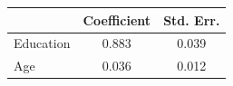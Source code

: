 \begin{tabular}{lcc}
\toprule
 & Coefficient & Std. Err. \\
\midrule
Education &  0.883 &  0.039 \\
Age &  0.036 &  0.012 \\
\bottomrule
\end{tabular}
